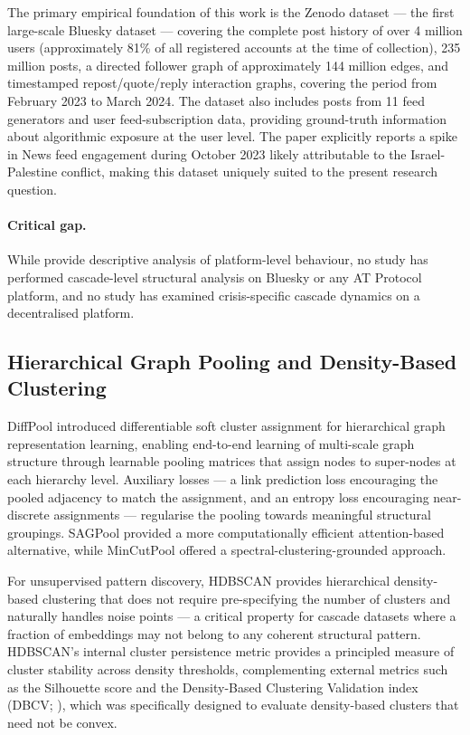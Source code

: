 \documentclass[12pt, a4paper]{article}
\begin{document}
The primary empirical foundation of this work is the \citet{failla2024bluesky} Zenodo dataset --- the first large-scale Bluesky dataset --- covering the complete post history of over 4 million users (approximately 81\% of all registered accounts at the time of collection), 235 million posts, a directed follower graph of approximately 144 million edges, and timestamped repost/quote/reply interaction graphs, covering the period from February 2023 to March 2024. The dataset also includes posts from 11 feed generators and user feed-subscription data, providing ground-truth information about algorithmic exposure at the user level. The paper explicitly reports a spike in News feed engagement during October 2023 likely attributable to the Israel-Palestine conflict, making this dataset uniquely suited to the present research question.

\paragraph{Critical gap.} While \citet{failla2024bluesky} provide descriptive analysis of platform-level behaviour, no study has performed cascade-level structural analysis on Bluesky or any AT Protocol platform, and no study has examined crisis-specific cascade dynamics on a decentralised platform.

\subsection{Hierarchical Graph Pooling and Density-Based Clustering}

DiffPool \citep{ying2018diffpool} introduced differentiable soft cluster assignment for hierarchical graph representation learning, enabling end-to-end learning of multi-scale graph structure through learnable pooling matrices that assign nodes to super-nodes at each hierarchy level. Auxiliary losses --- a link prediction loss encouraging the pooled adjacency to match the assignment, and an entropy loss encouraging near-discrete assignments --- regularise the pooling towards meaningful structural groupings. SAGPool \citep{lee2019sagpool} provided a more computationally efficient attention-based alternative, while MinCutPool \citep{bianchi2020mincutpool} offered a spectral-clustering-grounded approach.

For unsupervised pattern discovery, HDBSCAN \citep{mcinnes2017hdbscan} provides hierarchical density-based clustering that does not require pre-specifying the number of clusters and naturally handles noise points --- a critical property for cascade datasets where a fraction of embeddings may not belong to any coherent structural pattern. HDBSCAN's internal cluster persistence metric provides a principled measure of cluster stability across density thresholds, complementing external metrics such as the Silhouette score \citep{rousseeuw1987silhouettes} and the Density-Based Clustering Validation index (DBCV; \citealt{moulavi2014dbcv}), which was specifically designed to evaluate density-based clusters that need not be convex.
\end{document}

